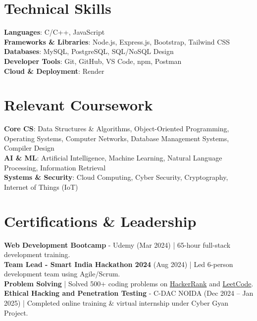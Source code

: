 \documentclass[letterpaper,11pt]{article}
\begin{document}
\section{Technical Skills}
 \begin{itemize}[leftmargin=0.15in, label={}]
    \small{\item{
      \textbf{Languages}{: C/C++, JavaScript} \\
      \textbf{Frameworks \& Libraries}{: Node.js, Express.js, Bootstrap, Tailwind CSS} \\
      \textbf{Databases}{: MySQL, PostgreSQL, SQL/NoSQL Design} \\
      \textbf{Developer Tools}{: Git, GitHub, VS Code, npm, Postman} \\
      \textbf{Cloud \& Deployment}{: Render} \\
    }}
 \end{itemize}

 
\section{Relevant Coursework}
 \begin{itemize}[leftmargin=0.15in, label={}]
    \small{\item{
     \textbf{Core CS}{: Data Structures \& Algorithms, Object-Oriented Programming, Operating Systems, Computer Networks, Database Management Systems, Compiler Design} \\
     \textbf{AI \& ML}{: Artificial Intelligence, Machine Learning, Natural Language Processing, Information Retrieval} \\
     \textbf{Systems \& Security}{: Cloud Computing, Cyber Security, Cryptography, Internet of Things (IoT)} \\
    }}
 \end{itemize}


\section{Certifications \& Leadership}
 \begin{itemize}[leftmargin=0.15in, label={}]
    \small{\item{
      \textbf{Web Development Bootcamp} - Udemy (Mar 2024) | 65-hour full-stack development training. \\
      \textbf{Team Lead - Smart India Hackathon 2024} (Aug 2024) | Led 6-person development team using Agile/Scrum. \\
      \textbf{Problem Solving} | Solved 500+ coding problems on \href{https://www.hackerrank.com/profile/lakshaygarg9812}{HackerRank} and \href{https://leetcode.com/u/iiitm_042301/}{LeetCode}. \\
      \textbf{Ethical Hacking and Penetration Testing} - C-DAC NOIDA (Dec 2024 -- Jan 2025) | Completed online training \& virtual internship under Cyber Gyan Project.
    }}
 \end{itemize}
\end{document}
